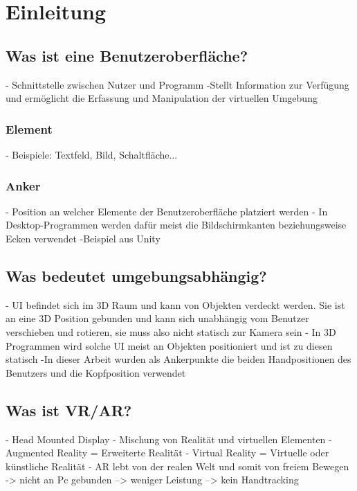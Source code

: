 
\chapter{Einleitung}\label{chapter:introduction}

	
	

	\section{Was ist eine Benutzeroberfläche?}
	- Schnittstelle zwischen Nutzer und Programm
	-Stellt Information zur Verfügung und ermöglicht die Erfassung und Manipulation der virtuellen Umgebung
	
		\subsection{Element}
		- Beispiele: Textfeld, Bild, Schaltfläche...
	
		\subsection{Anker}
		- Position an welcher Elemente der Benutzeroberfläche platziert werden
		- In Desktop-Programmen werden dafür meist die Bildschirmkanten beziehungsweise Ecken verwendet
		-Beispiel aus Unity
	
	\section{Was bedeutet umgebungsabhängig?}
	- UI befindet sich im 3D Raum und kann von Objekten verdeckt werden. Sie ist an eine 3D Position gebunden und kann sich unabhängig vom Benutzer verschieben und rotieren, sie muss also nicht statisch zur Kamera sein
	- In 3D Programmen wird solche UI meist an Objekten positioniert und ist zu diesen statisch
	-In dieser Arbeit wurden als Ankerpunkte die beiden Handpositionen des Benutzers und die Kopfposition verwendet
	
	\section{Was ist VR/AR?}
	- Head Mounted Display
	- Mischung von Realität und virtuellen Elementen
	- Augmented Reality = Erweiterte Realität
	- Virtual Reality = Virtuelle oder künstliche Realität
	- AR lebt von der realen Welt und somit von freiem Bewegen
	-> nicht an Pc gebunden
	--> weniger Leistung
	--> kein Handtracking